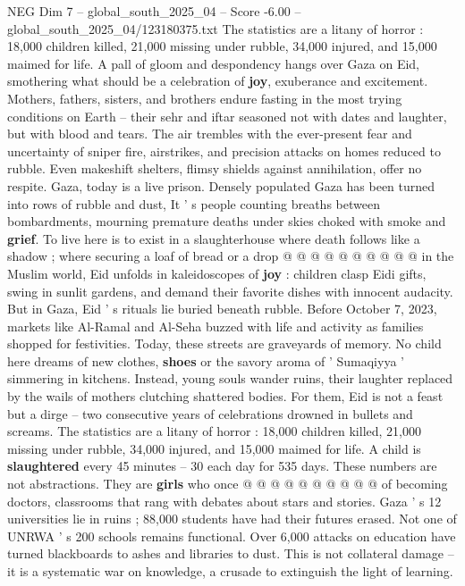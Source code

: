 \begin{textsample}{NEG Dim 7 – global\_south\_2025\_04 – Score -6.00 – global\_south\_2025\_04/123180375.txt}  \label{ex:f7_neg_304}
The statistics are a litany of horror : 18,000 children killed, 21,000 missing under rubble, 34,000 injured, and 15,000 maimed for life.
A pall of gloom and despondency hangs over Gaza on Eid, smothering what should be a celebration of \textbf{joy}, exuberance and excitement.
Mothers, fathers, sisters, and brothers endure fasting in the most trying conditions on Earth -- their sehr and iftar seasoned not with dates and laughter, but with blood and tears.
The air trembles with the ever-present fear and uncertainty of sniper fire, airstrikes, and precision attacks on homes reduced to rubble.
Even makeshift shelters, flimsy shields against annihilation, offer no respite.
Gaza, today is a live prison.
Densely populated Gaza has been turned into rows of rubble and dust, It ' s people counting breaths between bombardments, mourning premature deaths under skies choked with smoke and \textbf{grief}.
To live here is to exist in a slaughterhouse where death follows like a shadow ; where securing a loaf of bread or a drop @ @ @ @ @ @ @ @ @ @ in the Muslim world, Eid unfolds in kaleidoscopes of \textbf{joy} : children clasp Eidi gifts, swing in sunlit gardens, and demand their favorite dishes with innocent audacity.
But in Gaza, Eid ' s rituals lie buried beneath rubble.
Before October 7, 2023, markets like Al-Ramal and Al-Seha buzzed with life and activity as families shopped for festivities.
Today, these streets are graveyards of memory.
No child here dreams of new clothes, \textbf{shoes} or the savory aroma of ' Sumaqiyya ' simmering in kitchens.
Instead, young souls wander ruins, their laughter replaced by the wails of mothers clutching shattered bodies.
For them, Eid is not a feast but a dirge -- two consecutive years of celebrations drowned in bullets and screams.
The statistics are a litany of horror : 18,000 children killed, 21,000 missing under rubble, 34,000 injured, and 15,000 maimed for life.
A child is \textbf{slaughtered} every 45 minutes -- 30 each day for 535 days.
These numbers are not abstractions.
They are \textbf{girls} who once @ @ @ @ @ @ @ @ @ @ of becoming doctors, classrooms that rang with debates about stars and stories.
Gaza ' s 12 universities lie in ruins ; 88,000 students have had their futures erased.
Not one of UNRWA ' s 200 schools remains functional.
Over 6,000 attacks on education have turned blackboards to ashes and libraries to dust.
This is not collateral damage -- it is a systematic war on knowledge, a crusade to extinguish the light of learning.

\end{textsample}
